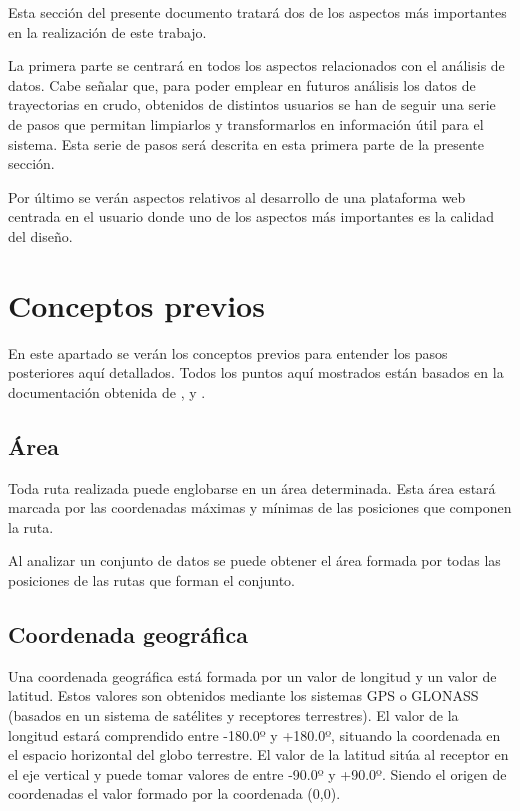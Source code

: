 
Esta sección del presente documento tratará dos de los aspectos más importantes en la realización de este trabajo.

La primera parte se centrará en todos los aspectos relacionados con el análisis de datos. Cabe señalar que, para poder emplear en futuros análisis los datos de trayectorias en crudo, obtenidos de distintos usuarios se han de seguir una serie de pasos que permitan limpiarlos y transformarlos en información útil para el sistema. Esta serie de pasos será descrita en esta primera parte de la presente sección.

Por último se verán aspectos relativos al desarrollo de una plataforma web centrada en el usuario donde uno de los aspectos más importantes es la calidad del diseño.



\section{Conceptos previos}
En este apartado se verán los conceptos previos para entender los pasos posteriores aquí detallados. Todos los puntos aquí mostrados están basados en la documentación obtenida de \cite{survey:info}, \cite{semantic:info} y \cite{modeling:info}. 

\subsection{Área}
Toda ruta realizada puede englobarse en un área determinada. Esta área estará marcada por las coordenadas máximas y mínimas de las posiciones que componen la ruta.

Al analizar un conjunto de datos se puede obtener el área formada por todas las posiciones de las rutas que forman el conjunto.

\subsection{Coordenada geográfica}
Una coordenada geográfica \cite{coord:wiki} está formada por un valor de longitud y un valor de latitud. Estos valores son obtenidos mediante los sistemas GPS o GLONASS (basados en un sistema de satélites y receptores terrestres). El valor de la longitud estará comprendido entre -180.0º y +180.0º, situando la coordenada en el espacio horizontal del globo terrestre. El valor de la latitud sitúa al receptor en el eje vertical y puede tomar valores de entre -90.0º y +90.0º. Siendo el origen de coordenadas el valor formado por la coordenada (0,0).


